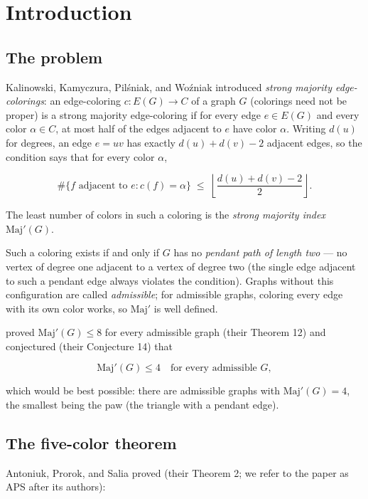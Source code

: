 \documentclass[11pt]{article}
\theoremstyle{definition}
\theoremstyle{remark}
\begin{document}
\section{Introduction}\label{1-introduction}

\subsection{The problem}\label{11-the-problem}

Kalinowski, Kamyczura, Pilśniak, and Woźniak \cite{KKPW} introduced \emph{strong majority edge-colorings}: an edge-coloring \(c \colon E(G) \to C\) of a graph \(G\) (colorings need not be proper) is a strong majority edge-coloring if for every edge \(e \in E(G)\) and every color \(\alpha \in C\), at most half of the edges adjacent to \(e\) have color \(\alpha\). Writing \(d(u)\) for degrees, an edge \(e = uv\) has exactly \(d(u) + d(v) - 2\) adjacent edges, so the condition says that for every color \(\alpha\),

\[\#\{f \text{ adjacent to } e : c(f) = \alpha\} \;\le\; \left\lfloor \frac{d(u)+d(v)-2}{2} \right\rfloor .\]

The least number of colors in such a coloring is the \emph{strong majority index} \(\mathrm{Maj}'(G)\).

Such a coloring exists if and only if \(G\) has no \emph{pendant path of length two} --- no vertex of degree one adjacent to a vertex of degree two (the single edge adjacent to such a pendant edge always violates the condition). Graphs without this configuration are called \emph{admissible}; for admissible graphs, coloring every edge with its own color works, so \(\mathrm{Maj}'\) is well defined.

\cite{KKPW} proved \(\mathrm{Maj}'(G) \le 8\) for every admissible graph (their Theorem 12) and conjectured (their Conjecture 14) that

\[\mathrm{Maj}'(G) \le 4 \quad \text{for every admissible } G,\]

which would be best possible: there are admissible graphs with \(\mathrm{Maj}'(G) = 4\), the smallest being the paw (the triangle with a pendant edge).

\subsection{The five-color theorem}\label{12-the-five-color-theorem}

Antoniuk, Prorok, and Salia \cite{APS} proved (their Theorem 2; we refer to the paper as APS after its authors):
\end{document}
